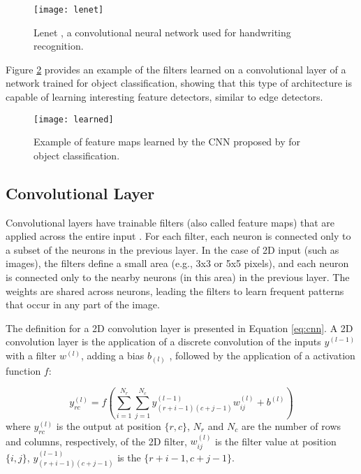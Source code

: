 \begin{figure}[!htb]
\centering
\texttt{[image: lenet]}
\caption{Lenet \cite{lecun1998gradient}, a convolutional neural network used for handwriting recognition.}
\label{lenet}
\end{figure}

Figure \ref{learned} provides an example of the filters learned on a convolutional layer of a network trained for object classification, showing that this type of architecture is
capable of learning interesting feature detectors, similar to edge detectors.
\begin{figure}[!htb]
\centering
\texttt{[image: learned]}
\caption{Example of feature maps learned by the CNN proposed by \cite{krizhevsky2012imagenet} for object classification.}
\label{learned}
\end{figure}


\subsection{Convolutional Layer}
Convolutional layers have trainable filters (also called feature maps) that are applied
across the entire input \cite{lecun1995convolutional}. For each filter, each neuron is connected only to a subset of
the neurons in the previous layer. In the case of 2D input (such as images), the filters
define a small area (e.g., 3x3 or 5x5 pixels), and each neuron is connected only to the
nearby neurons (in this area) in the previous layer. The weights are shared across neurons,
leading the filters to learn frequent patterns that occur in any part of the image.

The definition for a 2D convolution layer is presented in Equation \ref{eq:cnn}. A 2D convolution layer is the application of a discrete convolution of the inputs $y^{(l-1)}$ with a filter $w^{(l)}$, adding a bias $b_{(l)}$ , followed by the application of a activation function $f$:

\begin{equation}
y^{(l)}_{rc} = f(\sum_{i=1}^{N_{r}} \sum_{j=1}^{N_{c}} y^{(l-1)}_{(r+i-1)(c+j-1)} w^{(l)}_{ij} + b^{(l)} )
\label{eq:cnn}
\end{equation}
where $y^{(l)}_{rc}$ is the output at position $\{r,c\}$, $N_{r}$ and $N_{c}$ are the number of rows and columns, respectively, of the 2D filter, $w^{(l)}_{ij}$ is the filter value at position $\{i,j\}$, $y^{(l-1)}_{(r+i-1)(c+j-1)}$ is the $\{r+i-1,c+j-1\}$.


